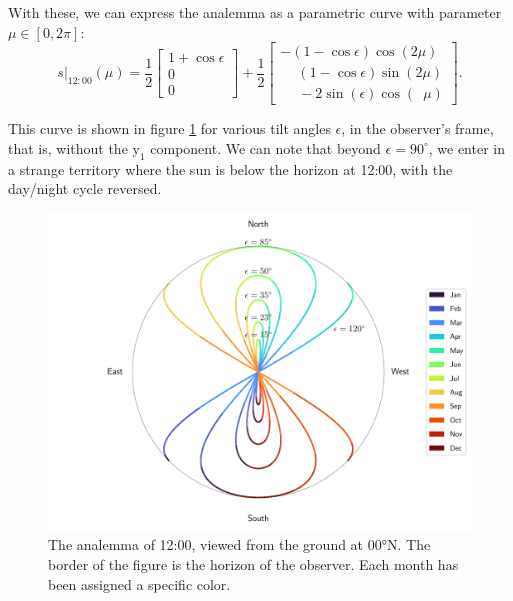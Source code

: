 \documentclass[12pt]{article}
\begin{document}
With these, we can express the analemma as a 
parametric curve with parameter 
$\mu \in [0,2\pi]$:
\begin{equation}
    s\vert_{12:00}(\mu) =
    \frac{1}{2}
    \begin{bmatrix}
        1+\cos\epsilon\\
        0\\
        0
    \end{bmatrix}+
    \frac{1}{2}
    \begin{bmatrix}
        - (1-\cos\epsilon) \cos(2\mu)\\
        \phantom{+} (1-\cos\epsilon) \sin(2\mu)\\
        \quad\;-2\sin(\epsilon) \cos(\phantom{2}\mu)
    \end{bmatrix}.
\end{equation}

This curve is shown in figure \ref{fig:analemma_easy} for various 
tilt angles $\epsilon$, in the observer's frame, that is, without the 
$\mathrm{y}_1$ component. We can note that beyond $\epsilon=90^\circ$, we
enter in a strange territory where the sun is below the horizon at 12:00, with
the day/night cycle reversed.
\begin{figure}[ht]
    \centering
    \includegraphics[width=\textwidth]{./analemma_plot.pdf}
    \caption{
        The analemma of 12:00, viewed from the ground at 00°N. 
        The border of the figure is the horizon of the observer. 
        Each month has been assigned a specific color.
    }
    \label{fig:analemma_easy}
\end{figure}
\end{document}
